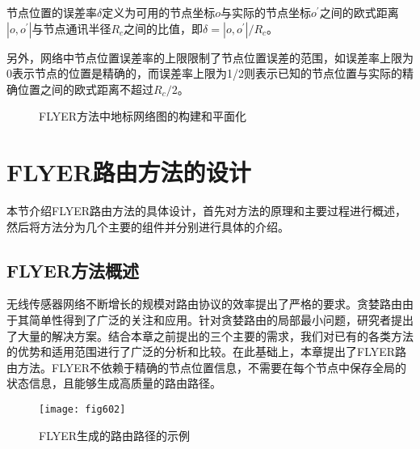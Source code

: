 \begin{definition}\label{def:602}
节点位置的误差率$\delta$定义为可用的节点坐标$o$与实际的节点坐标$o^{'}$之间的欧式距离$|o, o^{'}|$与节点通讯半径$R_c$之间的比值，即$\delta=|o, o^{'}|/R_c$。
\end{definition}
另外，网络中节点位置误差率的上限限制了节点位置误差的范围，如误差率上限为0表示节点的位置是精确的，而误差率上限为1/2则表示已知的节点位置与实际的精确位置之间的欧式距离不超过$R_c/2$。
\begin{figure}[t]
  \centering
  \hspace{0.5em}%
  \hspace{0.5em}%
  \hspace{0.5em}%
  \caption{FLYER方法中地标网络图的构建和平面化}
  \label{fig:601}
\end{figure}
\section{FLYER路由方法的设计}
本节介绍FLYER路由方法的具体设计，首先对方法的原理和主要过程进行概述，然后将方法分为几个主要的组件并分别进行具体的介绍。
\subsection{FLYER方法概述}
无线传感器网络不断增长的规模对路由协议的效率提出了严格的要求。贪婪路由由于其简单性得到了广泛的关注和应用。针对贪婪路由的局部最小问题，研究者提出了大量的解决方案。结合本章之前提出的三个主要的需求，我们对已有的各类方法的优势和适用范围进行了广泛的分析和比较。在此基础上，本章提出了FLYER路由方法。FLYER不依赖于精确的节点位置信息，不需要在每个节点中保存全局的状态信息，且能够生成高质量的路由路径。
\begin{figure}[h]
\centering
\texttt{[image: fig602]}
\caption{FLYER生成的路由路径的示例}
\label{fig:602}
\end{figure}

